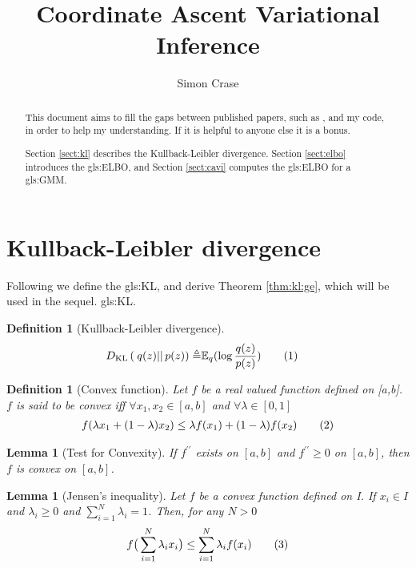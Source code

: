 \documentclass[]{article}
\title{Coordinate Ascent Variational Inference}
\author{Simon Crase}
\newcommand{\Expectation} {\mathbb{E}}
\newcommand{\KLD}[2]{D_{\mathrm{KL}} \left( \left. \left. #1 \right|\right| #2 \right) }
\newcommand\numberthis    {\addtocounter{equation}{1}\tag{\theequation}}
\newtheorem{defn}[thm]{Definition}
\newtheorem{lemma}[thm]{Lemma}
\begin{document}
\maketitle

\begin{abstract}
	This document aims to fill the gaps between published papers, such as \cite{blei2017variational}, and my code\cite{crase2022learn}, in order to help my understanding. If it is helpful to anyone else it is a bonus.
	
	Section \ref{sect:kl} describes the Kullback-Leibler divergence. Section \ref{sect:elbo} introduces the \gls{gls:ELBO}, and Section \ref{sect:cavi} computes the \gls{gls:ELBO} for a \gls{gls:GMM}.
\end{abstract}

\tableofcontents
\listoftables
\listoftheorems

\section{Kullback-Leibler divergence}\label{sect:kl}

Following \cite{blei2017variational} we define the \gls{gls:KL}, and derive Theorem \ref{thm:kl:ge}, which will be used in the sequel. \glsdesc{gls:KL}.
	
\begin{defn}[Kullback-Leibler divergence]
	\begin{align*}
		\KLD{q(z)}{p(z)} \triangleq& \Expectation_q(\log{\frac{q(z)}{p(z)}}) \numberthis \label{eq:kl}
	\end{align*}
\end{defn}

\begin{defn}[Convex function]
	Let $f$ be a real valued function defined on [a,b]. $f$ is said to be convex iff $\forall x_1,x_2 \in [a,b]$ and $\forall \lambda \in [0,1]$
	\begin{align*}
		f(\lambda x_1 + (1-\lambda) x_2) \le \lambda f(x_1) + (1-\lambda)f(x_2) \numberthis \label{eq:convex}
	\end{align*}
\end{defn}

\begin{lemma}[Test for Convexity]\label{lemma:convex}
	If $f^{\prime\prime}$ exists on $[a,b]$ and $f^{\prime\prime}\ge0$ on $[a,b]$, then $f$ is convex on $[a,b]$. 
\end{lemma}

\begin{lemma}[Jensen's inequality]\label{lemma:jensen}
	\cite{rudin1966real}Let $f$ be a convex function defined on I. If $x_i \in I$ and $\lambda_i \ge 0$ and $\sum_{i=1}^{N} \lambda_i=1$. Then, for any $N>0$
	\begin{align*}
		f\big(\sum_{i=1}^{N} \lambda_i x_i\big) \le \sum_{i=1}^{N} \lambda_i f(x_i) \numberthis \label{eq:jensen}
	\end{align*}
\end{lemma}
\end{document}
